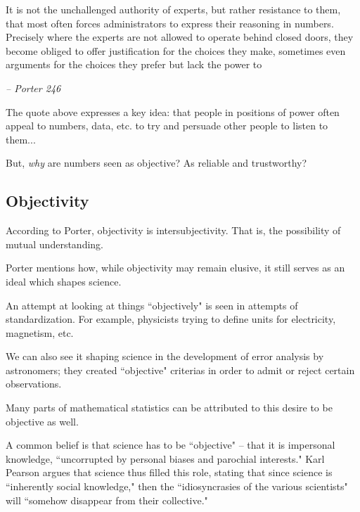 \documentclass[openany]{book}
\begin{document}
\begin{fancyquotes}
	It is not the unchallenged authority of experts, but rather resistance to them, that most often forces administrators to express their reasoning in numbers. Precisely where the experts are not allowed
	to operate behind closed doors, they become obliged to offer justification for the choices they make, sometimes even arguments for the
	choices they prefer but lack the power to
	
	\begin{flushright}
		\emph{\textit{-- Porter 246}}
	\end{flushright}
\end{fancyquotes}

The quote above expresses a key idea: that people in positions of power often appeal to numbers, data, etc. to try and persuade other people to listen to them...

But, \textit{why} are numbers seen as objective? As reliable and trustworthy?

\subsection{Objectivity}
\begin{defn}[Objectivity]
	According to Porter, objectivity is intersubjectivity. That is, the possibility of mutual understanding.
\end{defn}

Porter mentions how, while objectivity may remain elusive, it still serves as an ideal which shapes science.

An attempt at looking at things ``objectively" is seen in attempts of standardization. For example, physicists trying to define units for electricity, magnetism, etc.

We can also see it shaping science in the development of error analysis by astronomers; they created ``objective" criterias in order to admit or reject certain observations.

Many parts of mathematical statistics can be attributed to this desire to be objective as well.

A common belief is that science has to be ``objective" -- that it is impersonal knowledge, ``uncorrupted by personal biases and parochial interests." Karl Pearson argues that science thus filled this role, stating that since science is ``inherently social knowledge," then the ``idiosyncrasies of the various scientists" will ``somehow disappear from their collective."
\end{document}
